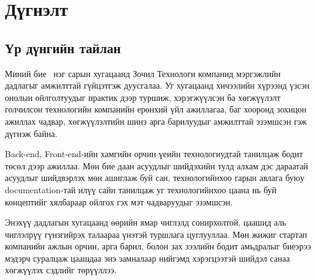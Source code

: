 \chapter{Дүгнэлт}
\section{Үр дүнгийн тайлан}
Миний бие \@author \ нэг сарын хугацаанд Зочил Технологи компанид мэргэжлийн дадлагыг амжилттай гүйцэтгэж дуусгалаа. Уг хугацаанд хичээлийн хүрээнд үзсэн онолын ойлголтуудыг практик дээр туршиж, хэрэгжүүлсэн ба хөгжүүлэлт голчилсон технологийн компанийн ерөнхий үйл ажиллагаа, баг хооронд зохицон ажиллах чадвар, хөгжүүлэлтийн шинэ арга барилуудыг амжилттай эзэмшсэн гэж дүгнэж байна.

Back-end, Front-end-ийн хамгийн орчин үеийн технологиудтай танилцаж бодит төсөл дээр ажиллаа. Мөн бие даан асуудлыг шийдэхийн тулд алхам дэс дараатай асуудлыг шийдвэрлэх мөн ашиглаж буй сан, технологийнхоо гарын авлага буюу documentation-тай илүү сайн танилцаж уг технологийнхоо цаана нь буй концептийг хялбараар ойлгох гэх мэт чадваруудыг эзэмшсэн.

Энэхүү дадлагын хугацаанд өөрийн ямар чиглэлд сонирхолтой, цаашид аль чиглэлрүү гүнзгийрэх талаараа үнэтэй туршлага цуглууллаа. Мөн жижиг стартап компанийн ажлын орчин, арга барил, болон зах зээлийн бодит амьдралыг биеэрээ мэдэрч суралцаж цаашдаа энэ замналаар нийгэмд хэрэгцээтэй шийдэл санаа хөгжүүлэх сэдлийг төрүүллээ.
